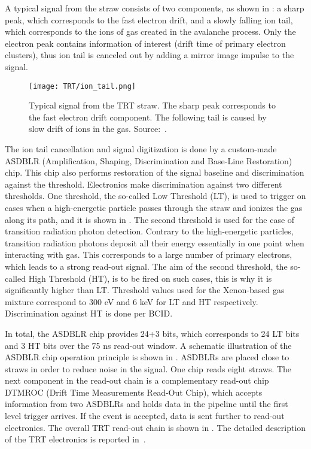 A typical signal from the straw consists of two components, as shown in : 
a sharp peak, which corresponds to the fast electron drift, and a slowly falling ion tail, which corresponds to the ions of gas created in the avalanche process.
Only the electron peak contains information of interest (drift time of primary electron clusters), thus ion tail is canceled out by adding a mirror image impulse to the signal.

\begin{figure}
\centering
\texttt{[image: TRT/ion\_tail.png]}
\caption{ 
 Typical signal from the TRT straw. The sharp peak corresponds to the fast electron drift component.
 The following tail is caused by slow drift of ions in the gas.
 Source:~\cite{ID_TDR_vol2}.
}
\label{fig:ion_tail}
\end{figure}

The ion tail cancellation and signal digitization is done by a custom-made ASDBLR (Amplification, Shaping, Discrimination and Base-Line Restoration) chip. 
This chip also performs restoration of the signal baseline and discrimination against the threshold. 
Electronics make discrimination against two different thresholds. One threshold, the so-called Low Threshold (LT), 
is used to trigger on cases when a high-energetic particle passes through the straw and ionizes the gas along its path, and it is shown in .
The second threshold is used for the case of transition radiation photon detection.
Contrary to the high-energetic particles, transition radiation photons deposit all their energy essentially in one point when interacting with gas.
This corresponds to a large number of primary electrons, which leads to a strong read-out signal.
The aim of the second threshold, the so-called High Threshold (HT), is to be fired on such cases, this is why it is significantly higher than LT.
Threshold values used for the Xenon-based gas mixture correspond to 300 eV and 6 keV for LT and HT respectively.
Discrimination against HT is done per BCID. 

In total, the ASDBLR chip provides 24+3 bits, which corresponds to 24 LT bits and 3 HT bits over the 75 ns read-out window.
A schematic illustration of the ASDBLR chip operation principle is shown in .
ASDBLRs are placed close to straws in order to reduce noise in the signal. One chip reads eight straws.
The next component in the read-out chain is a complementary read-out chip DTMROC (Drift Time Measurements Read-Out Chip), which accepts 
information from two ASDBLRs and holds data in the pipeline until the first level trigger arrives. If the event is accepted, data is sent further to read-out electronics.
The overall TRT read-out chain is shown in . The detailed description of the TRT electronics is reported in~\cite{TRT_electronics}.

